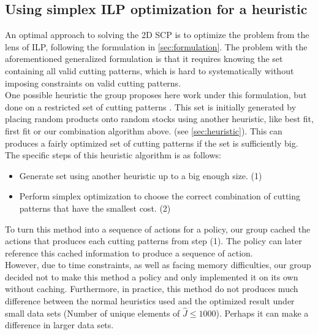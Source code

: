 \documentclass[a4paper]{article}
\begin{document}
    \subsection{Using simplex ILP optimization for a heuristic}
    An optimal approach to solving the 2D SCP is to optimize the problem from the lens of ILP, following the formulation in \ref{sec:formulation}. The problem with the aforementioned generalized formulation is that it requires knowing the set  containing all valid cutting patterns, which is hard to systematically without imposing constraints on valid cutting patterns.
    \vspace{0.2cm}\\
    One possible heuristic the group proposes here work under this formulation, but done on a restricted set of cutting patterns . This set is initially generated by placing random products onto random stocks using another heuristic, like best fit, first fit or our combination algorithm above. (see \ref{sec:heuristic}).
    This can produces a fairly optimized set of cutting patterns if the set  is sufficiently big.
    \vspace{0.2cm}\\
    The specific steps of this heuristic algorithm is as follows:
    \begin{itemize}
        \item Generate set  using another heuristic up to a big enough size. (1)
        \item Perform simplex optimization to choose the correct combination of cutting patterns that have the smallest cost. (2)
    \end{itemize}
    \vspace{0.2cm}
    To turn this method into a sequence of actions for a policy, our group cached the actions that produces each cutting patterns from step (1). The policy can later reference this cached information to produce a sequence of action.
    \vspace{0.2cm}\\
    However, due to time constraints, as well as facing memory difficulties, our group decided not to make this method a policy and only implemented it on its own without caching. Furthermore, in practice, this method do not produces much difference between the normal heuristics used and the optimized result under small data sets (Number of unique elements of $ \hat{J} \leqslant 1000$). Perhaps it can make a difference in larger data sets.
    \pagebreak
\end{document}
